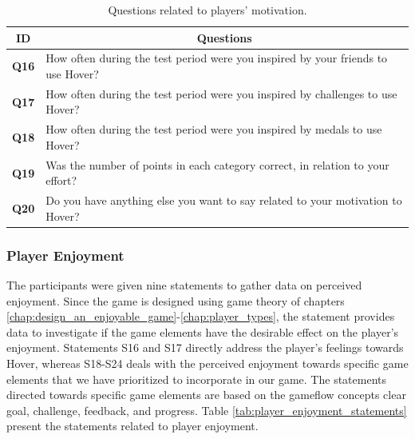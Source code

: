 \begin{table}[H]
    \centering
    \begin{tabularx}{0.95\textwidth}{|c|X|}
        \hline
        \textbf{ID} & \multicolumn{1}{c|}{\textbf{Questions}} \\ \hline
        \textbf{Q16} & How often during the test period were you inspired by your friends to use Hover? \\
        \textbf{Q17} & How often during the test period were you inspired by challenges to use Hover? \\
        \textbf{Q18} & How often during the test period were you inspired by medals to use Hover? \\
        \textbf{Q19} & Was the number of points in each category correct, in relation to your effort? \\
        \textbf{Q20} & Do you have anything else you want to say related to your motivation to Hover? \\ \hline
    \end{tabularx}
    \caption{Questions related to players' motivation.}
    \label{tab:player_motivation_questions}
\end{table}

\subsubsection{Player Enjoyment}
The participants were given nine statements to gather data on perceived enjoyment. Since the game is designed using game theory of chapters \ref{chap:design_an_enjoyable_game}-\ref{chap:player_types}, the statement provides data to investigate if the game elements have the desirable effect on the player’s enjoyment. Statements S16 and S17 directly address the player’s feelings towards Hover, whereas S18-S24 deals with the perceived enjoyment towards specific game elements that we have prioritized to incorporate in our game. The statements directed towards specific game elements are based on the gameflow concepts clear goal, challenge, feedback, and progress. Table \ref{tab:player_enjoyment_statements} present the statements related to player enjoyment.

